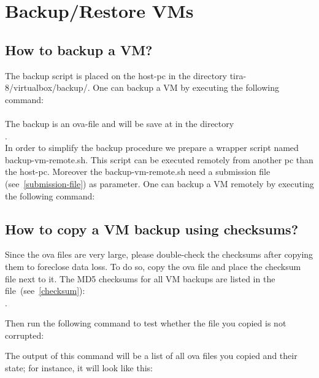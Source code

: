 \chapter{Backup/Restore VMs}

\section{How to backup a VM?}
The backup script is placed on the host-pc in the directory tira-8/virtualbox/backup/.
One can backup a VM by executing the following command:\\
\\
The backup is an ova-file and will be save at in the directory\\.\\
\medskip\noindent
In order to simplify the backup procedure we prepare a wrapper script named backup-vm-remote.sh. This script can be executed remotely from another pc than the host-pc. 
Moreover the backup-vm-remote.sh need a submission file (see~\ref{submission-file}) as parameter. 
One can backup a VM remotely by executing the following command:\\


\section{How to copy a VM backup using checksums?}\label{copy-vm-backup}
Since the ova files are very large, please double-check the checksums after copying them to foreclose data loss. To do so, copy the ova file and place the checksum file next to it. 
The MD5 checksums for all VM backups are listed in the file~(see~\ref{checksum}):\\
.

\medskip\noindent
Then run the following command to test whether the file you copied is not corrupted:\\

\medskip\noindent
The output of this command will be a list of all ova files you copied and their
state; for instance, it will look like this:\\

